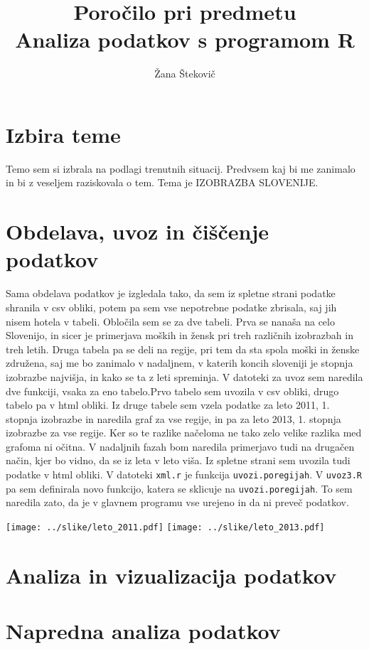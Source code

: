 \documentclass[11pt,a4paper]{article}
\begin{document}
\title{Poročilo pri predmetu \\
Analiza podatkov s programom R}
\author{Žana Štekovič}
\maketitle

\section{Izbira teme}
Temo sem si izbrala na podlagi trenutnih situacij. Predvsem kaj bi me zanimalo in bi z veseljem raziskovala o tem.
Tema je IZOBRAZBA SLOVENIJE.

\section{Obdelava, uvoz in čiščenje podatkov}
Sama obdelava podatkov je izgledala tako, da sem iz spletne strani podatke shranila v csv obliki, potem pa sem vse nepotrebne podatke zbrisala, saj jih nisem hotela v tabeli.
Obločila sem se za dve tabeli. Prva se nanaša na celo Slovenijo, in sicer je primerjava moških in žensk pri treh različnih izobrazbah in treh letih.
Druga tabela pa se deli na regije, pri tem da sta spola moški in ženske združena, saj me bo zanimalo v nadaljnem, v katerih koncih sloveniji je stopnja izobrazbe najvišja, in kako se ta z leti spreminja.
V datoteki za uvoz sem naredila dve funkciji, vsaka za eno tabelo.Prvo tabelo sem uvozila v csv obliki, drugo tabelo pa v html obliki. Iz druge tabele sem vzela podatke za leto 2011, 1. stopnja izobrazbe in naredila graf za vse regije, in pa za leto 2013, 1. stopnja izobrazbe za vse regije. Ker so te razlike načeloma ne tako zelo velike razlika med grafoma ni očitna.
V nadaljnih fazah bom naredila primerjavo tudi na drugačen način, kjer bo vidno, da se iz leta v leto viša.  Iz spletne strani sem uvozila tudi podatke v html obliki. V datoteki \verb|xml.r| je funkcija \verb|uvozi.poregijah|. V \verb|uvoz3.R| pa sem definirala novo funkcijo, katera se sklicuje na \verb|uvozi.poregijah|. To sem naredila zato, da je v glavnem programu vse urejeno in da ni preveč podatkov.

\texttt{[image: ../slike/leto\_2011.pdf]}
\texttt{[image: ../slike/leto\_2013.pdf]}

\section{Analiza in vizualizacija podatkov}


\section{Napredna analiza podatkov}

\end{document}
